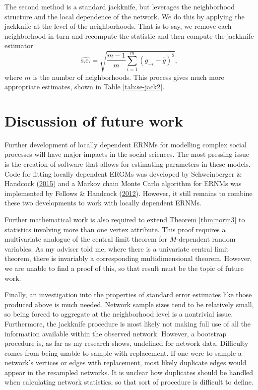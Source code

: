 \documentclass[12pt,twoside]{reedthesis}
\theoremstyle{definition}
\theoremstyle{definition}
\theoremstyle{remark}
\begin{document}
The second method is a standard jackknife, but leverages the
neighborhood structure and the local dependence of the network. We do
this by applying the jackknife at the level of the neighborhoods. That
is to say, we remove each neighborhood in turn and recompute the
statistic and then compute the jackknife estimator
\begin{equation}
\widehat{\text{s.e.}} = \sqrt{\frac{m-1}{m} \sum_{i = 1}^m (g_{-i} - \bar{g})^2},
\end{equation}
where \(m\) is the number of neighborhoods. This process gives much more
appropriate estimates, shown in Table \ref{tab:se-jack2}.

\section{Discussion of future work}\label{discussion-of-future-work}

Further development of locally dependent ERNMs for modelling complex
social processes will have major impacts in the social sciences. The
most pressing issue is the creation of software that allows for
estimating parameters in these models. Code for fitting locally
dependent ERGMs was developed by Schweinberger \& Handcock
(\protect\hyperlink{ref-Schweinberger2015}{2015}) and a Markov chain
Monte Carlo algorithm for ERNMs was implemented by Fellows \& Handcock
(\protect\hyperlink{ref-Fellows2012}{2012}). However, it still remains
to combine these two developments to work with locally dependent ERNMs.

Further mathematical work is also required to extend Theorem
\ref{thm:norm3} to statistics involving more than one vertex attribute.
This proof requires a multivariate analogue of the central limit theorem
for \(M\)-dependent random variables. As my adviser told me, where there
is a univariate central limit theorem, there is invariably a
corresponding multidimensional theorem. However, we are unable to find a
proof of this, so that result must be the topic of future work.

Finally, an investigation into the properties of standard error
estimates like those produced above is much needed. Network sample sizes
tend to be relatively small, so being forced to aggregate at the
neighborhood level is a nontrivial issue. Furthermore, the jackknife
procedure is most likely not making full use of all the information
available within the observed network. However, a bootstrap procedure
is, as far as my research shows, undefined for network data. Difficulty
comes from being unable to sample with replacement. If one were to
sample a network's vertices or edges with replacement, most likely
duplicate edges would appear in the resampled networks. It is unclear
how duplicates should be handled when calculating network statistics, so
that sort of procedure is difficult to define.
\end{document}
